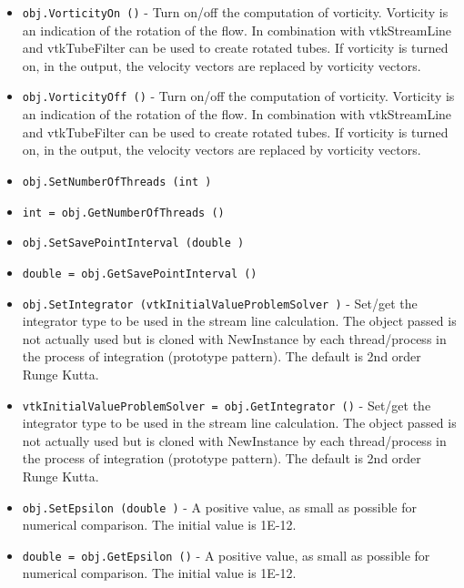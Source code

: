 \begin{itemize}
\item  \verb|obj.VorticityOn ()| -  Turn on/off the computation of vorticity. Vorticity is an indication of
 the rotation of the flow. In combination with vtkStreamLine and 
 vtkTubeFilter can be used to create rotated tubes. 
 If vorticity is turned on, in the output, the velocity vectors 
 are replaced by vorticity vectors.

\item  \verb|obj.VorticityOff ()| -  Turn on/off the computation of vorticity. Vorticity is an indication of
 the rotation of the flow. In combination with vtkStreamLine and 
 vtkTubeFilter can be used to create rotated tubes. 
 If vorticity is turned on, in the output, the velocity vectors 
 are replaced by vorticity vectors.

\item  \verb|obj.SetNumberOfThreads (int )|

\item  \verb|int = obj.GetNumberOfThreads ()|

\item  \verb|obj.SetSavePointInterval (double )|

\item  \verb|double = obj.GetSavePointInterval ()|

\item  \verb|obj.SetIntegrator (vtkInitialValueProblemSolver )| -  Set/get the integrator type to be used in the stream line
 calculation. The object passed is not actually used but
 is cloned with NewInstance by each thread/process in the
 process of integration (prototype pattern). The default is 
 2nd order Runge Kutta.

\item  \verb|vtkInitialValueProblemSolver = obj.GetIntegrator ()| -  Set/get the integrator type to be used in the stream line
 calculation. The object passed is not actually used but
 is cloned with NewInstance by each thread/process in the
 process of integration (prototype pattern). The default is 
 2nd order Runge Kutta.

\item  \verb|obj.SetEpsilon (double )| -  A positive value, as small as possible for numerical comparison.
 The initial value is 1E-12.

\item  \verb|double = obj.GetEpsilon ()| -  A positive value, as small as possible for numerical comparison.
 The initial value is 1E-12.

\end{itemize}
